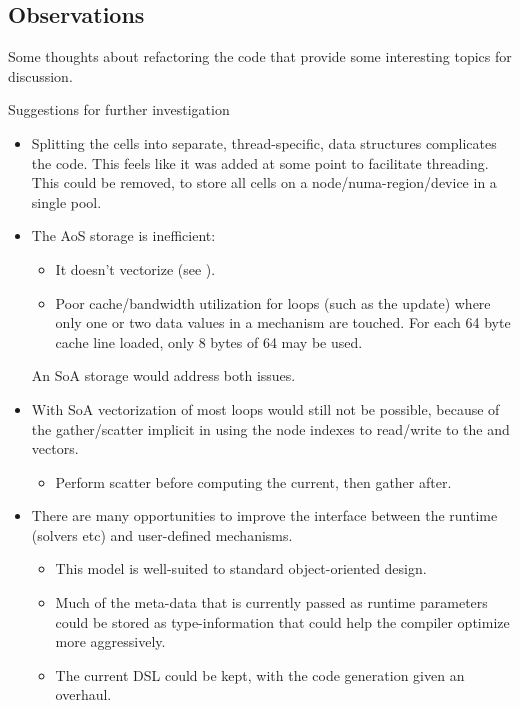 \subsection{Observations}
Some thoughts about refactoring the code that provide some interesting topics for discussion.
\begin{infobox}{Suggestions for further investigation}
\begin{itemize}[leftmargin=*]
\item
    Splitting the cells into separate, thread-specific, data structures complicates the code. This feels like it was added at some point to facilitate threading. This could be removed, to store all cells on a node/numa-region/device in a single pool.
\item
    The AoS storage is inefficient:
    \begin{itemize}
    \item
        It doesn't vectorize (see ).
    \item
        Poor cache/bandwidth utilization for loops (such as the  update) where only one or two data values in a mechanism are touched. For each 64 byte cache line loaded, only 8 bytes of 64 may be used.
    \end{itemize}
    An SoA storage would address both issues.
\item
    With SoA vectorization of most loops would still not be possible, because of the gather/scatter implicit in using the node indexes to read/write to the  and  vectors.
    \begin{itemize}
    \item
        Perform scatter before computing the current, then gather after.
    \end{itemize}
\item
    There are many opportunities to improve the interface between the runtime (solvers etc) and user-defined mechanisms.
    \begin{itemize}
    \item
        This model is well-suited to standard object-oriented design.
    \item
        Much of the meta-data that is currently passed as runtime parameters could be stored as type-information that could help the compiler optimize more aggressively.
    \item
        The current DSL could be kept, with the code generation given an overhaul.
    \end{itemize}

\end{itemize}
\end{infobox}
